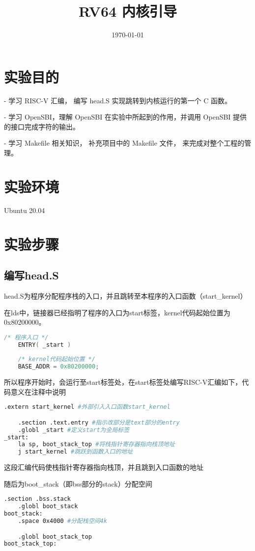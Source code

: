 \documentclass{source/Report}
\title{RV64 内核引导}
\date{\today}
\begin{document}
\makecover
\makeheader
\section{实验目的}
- 学习 RISC-V 汇编， 编写 head.S 实现跳转到内核运行的第一个 C 函数。

- 学习 OpenSBI，理解 OpenSBI 在实验中所起到的作用，并调用 OpenSBI 提供的接口完成字符的输出。

- 学习 Makefile 相关知识， 补充项目中的 Makefile 文件， 来完成对整个工程的管理。

\section{实验环境}
Ubuntu 20.04

\section{实验步骤}
\subsection{编写head.S}

head.S为程序分配程序栈的入口，并且跳转至本程序的入口函数（start\_kernel）

在lds中，链接器已经指明了程序的入口为start标签，kernel代码起始位置为0x80200000。

\begin{lstlisting}[language = c, title = {程序的入口}]
    /* 程序入口 */
    ENTRY( _start )
    
    /* kernel代码起始位置 */
    BASE_ADDR = 0x80200000;
\end{lstlisting}

所以程序开始时，会运行至start标签处，在start标签处编写RISC-V汇编如下，代码意义在注释中说明


\begin{lstlisting}[language = bash, title = {设置栈指针并跳转到主函数}]
    .extern start_kernel #外部引入入口函数start_kernel

    .section .text.entry #指示改部分是text部分的entry
    .globl _start #定义start为全局标签
_start:
    la sp, boot_stack_top #将栈指针寄存器指向栈顶地址
    j start_kernel #跳跃到函数入口的地址
\end{lstlisting}

这段汇编代码使栈指针寄存器指向栈顶，并且跳到入口函数的地址

随后为boot\_stack（即bss部分的stack）分配空间

\begin{lstlisting}[language = bash, title = {分配栈空间}]
    .section .bss.stack
    .globl boot_stack
boot_stack:
    .space 0x4000 #分配栈空间4k

    .globl boot_stack_top
boot_stack_top:
\end{lstlisting}
\end{document}
